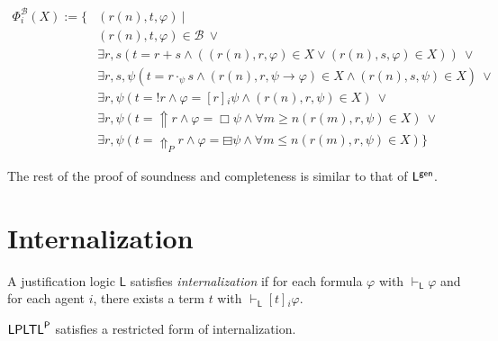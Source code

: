 \documentclass[envcountsect,envcountsame,oribibl,orivec]{llncs}
\newcommand{\lalways}{\Box}
\newcommand{\lsofar}{\boxminus}
\newcommand{\LPLTLp}{\textsf{LPLTL}^{\sf P}}
\newcommand{\jbox}[1]{\left[#1\right]\!}
\newcommand{\tinspect}{!}
\newcommand{\tgeneralize}{\Uparrow}
\newcommand{\agent}{i}
\renewcommand{\phi}{\varphi}
\newcommand{\B}{\mathcal{B}}
\newcommand{\Op}[1]{\Phi^{#1}}
\newcommand{\OpB}{\Op{\B}_i}
\begin{document}
\begin{equation*}
\begin{split}
\OpB(X) := \{ &(r(n),t,\phi) \ |\ \\
& (r(n),t,\phi) \in \B \ \lor \\
& \exists r, s (t=r+s \land ( (r(n),r,\phi) \in X \lor   (r(n),s,\phi) \in X )) \ \lor \\
& \exists r,s,\psi (t = r \cdot_\psi s \land (r(n),r,\psi \to \phi) \in X \land (r(n),s,\psi) \in X) \ \lor\\
& \exists r, \psi  (t= \tinspect r \land \phi = \jbox{r}_i \psi  \land  (r(n),r,\psi) \in X )  \ \lor\\
& \exists r,\psi ( t = \tgeneralize r \land \phi = \lalways \psi \land \forall m \geq n (r(m),r,\psi) \in X)  \ \lor\\
& \exists r,\psi ( t = \tgeneralize_P r \land \phi = \lsofar \psi \land \forall m \leq n (r(m),r,\psi) \in X) 
\}
\end{split}
\end{equation*}

The rest of the proof of soundness and completeness is similar to that of ${\sf L}^{\sf gen}$.



\section{Internalization}
\label{sec:Internalization}

\begin{definition}
	A justification logic $\mathsf{L}$ satisfies \emph{internalization} if for each formula $\phi$ with
	$
	 \vdash_\mathsf{L} \phi
	$
	and for each agent $\agent$, there exists a term $t$ with
	$
	\vdash_\mathsf{L} \jbox{t}_\agent \phi 
	$.
\end{definition}



$\LPLTLp$ satisfies a restricted form of internalization.
\end{document}
